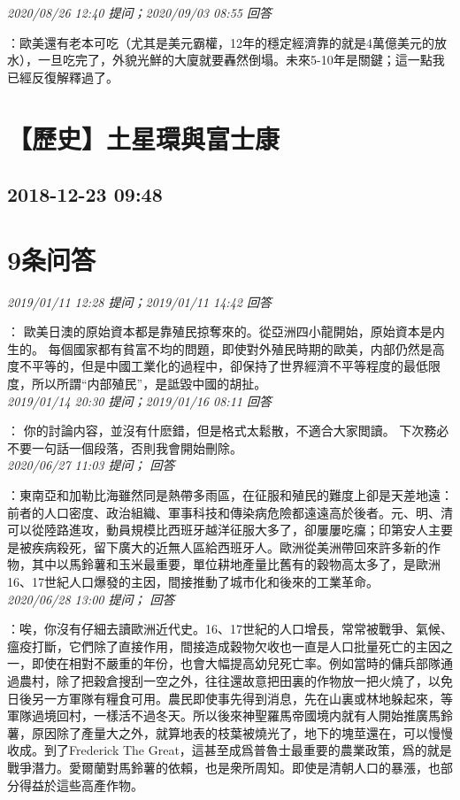 \documentclass[twocolumn]{ctexart}
\begin{document}
\textit{\hfill\noindent\small 2020/08/26 12:40 提问；2020/09/03 08:55 回答}

：歐美還有老本可吃（尤其是美元霸權，12年的穩定經濟靠的就是4萬億美元的放水），一旦吃完了，外貌光鮮的大廈就要轟然倒塌。未來5-10年是關鍵；這一點我已經反復解釋過了。
\\


\section{【歷史】土星環與富士康}
\subsection{2018-12-23 09:48}


\section{9条问答}

\textit{\hfill\noindent\small 2019/01/11 12:28 提问；2019/01/11 14:42 回答}

：
歐美日澳的原始資本都是靠殖民掠奪來的。從亞洲四小龍開始，原始資本是内生的。 
每個國家都有貧富不均的問題，即使對外殖民時期的歐美，内部仍然是高度不平等的，但是中國工業化的過程中，卻保持了世界經濟不平等程度的最低限度，所以所謂“内部殖民”，是詆毀中國的胡扯。
\\

\textit{\hfill\noindent\small 2019/01/14 20:30 提问；2019/01/16 08:11 回答}

：
你的討論内容，並沒有什麽錯，但是格式太鬆散，不適合大家閲讀。
下次務必不要一句話一個段落，否則我會開始刪除。
\\

\textit{\hfill\noindent\small 2020/06/27 11:03 提问； 回答}

：東南亞和加勒比海雖然同是熱帶多雨區，在征服和殖民的難度上卻是天差地遠：前者的人口密度、政治組織、軍事科技和傳染病危險都遠遠高於後者。元、明、清可以從陸路進攻，動員規模比西班牙越洋征服大多了，卻屢屢吃癟；印第安人主要是被疾病殺死，留下廣大的近無人區給西班牙人。歐洲從美洲帶回來許多新的作物，其中以馬鈴薯和玉米最重要，單位耕地產量比舊有的穀物高太多了，是歐洲16、17世紀人口爆發的主因，間接推動了城市化和後來的工業革命。\\

\textit{\hfill\noindent\small 2020/06/28 13:00 提问； 回答}

：唉，你沒有仔細去讀歐洲近代史。16、17世紀的人口增長，常常被戰爭、氣候、瘟疫打斷，它們除了直接作用，間接造成穀物欠收也一直是人口批量死亡的主因之一，即使在相對不嚴重的年份，也會大幅提高幼兒死亡率。例如當時的傭兵部隊通過農村，除了把穀倉搜刮一空之外，往往還故意把田裏的作物放一把火燒了，以免日後另一方軍隊有糧食可用。農民即使事先得到消息，先在山裏或林地躲起來，等軍隊過境回村，一樣活不過冬天。所以後來神聖羅馬帝國境内就有人開始推廣馬鈴薯，原因除了產量大之外，就算地表的枝葉被燒光了，地下的塊莖還在，可以慢慢收成。到了Frederick The Great，這甚至成爲普魯士最重要的農業政策，爲的就是戰爭潛力。愛爾蘭對馬鈴薯的依賴，也是衆所周知。即使是清朝人口的暴漲，也部分得益於這些高產作物。\\
\end{document}

